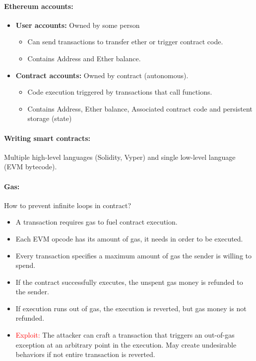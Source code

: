 \paragraph{Ethereum accounts:}
\begin{itemize}
    \item \textbf{User accounts:} Owned by some person
    \begin{itemize}
        \item Can send transactions to transfer ether or trigger contract code.
        \item Contains Address and Ether balance.
    \end{itemize}
    \item \textbf{Contract accounts: } Owned by contract (autonomous).
    \begin{itemize}
        \item Code execution triggered by transactions that call functions.
        \item Contains Address, Ether balance, Associated contract code and persistent storage (state)
    \end{itemize}{}
\end{itemize}{}

\paragraph{Writing smart contracts:} Multiple high-level languages (Solidity, Vyper) and single low-level language (EVM bytecode). 

\begin{minipage}{0.75\linewidth}
    \centering      
    \def\svgwidth{\linewidth}
        
\end{minipage}

\paragraph{Gas: } How to prevent infinite loops in contract?
\begin{itemize}
    \item A transaction requires gas to fuel contract execution.
    \item Each EVM opcode has its amount of gas, it needs in order to be executed.
    \item Every transaction specifies a maximum amount of gas the sender is willing to spend.
    \item If the contract successfully executes, the unspent gas money is refunded to the sender.
    \item If execution runs out of gas, the execution is reverted, but gas money is not refunded.
    \item[\color{red}{$\xrightarrow{}$}] \textcolor{red}{Exploit:} The attacker can craft a transaction that triggers an out-of-gas exception at an arbitrary point in the execution. May create undesirable behaviors if not entire transaction is reverted.
\end{itemize}{}


